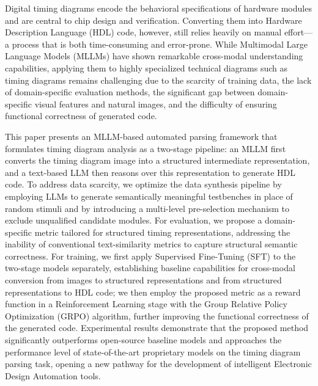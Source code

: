 \begin{abstract*}
  Digital timing diagrams encode the behavioral specifications of hardware modules and are central to chip design and verification. Converting them into Hardware Description Language (HDL) code, however, still relies heavily on manual effort---a process that is both time-consuming and error-prone. While Multimodal Large Language Models (MLLMs) have shown remarkable cross-modal understanding capabilities, applying them to highly specialized technical diagrams such as timing diagrams remains challenging due to the scarcity of training data, the lack of domain-specific evaluation methods, the significant gap between domain-specific visual features and natural images, and the difficulty of ensuring functional correctness of generated code.

  This paper presents an MLLM-based automated parsing framework that formulates timing diagram analysis as a two-stage pipeline: an MLLM first converts the timing diagram image into a structured intermediate representation, and a text-based LLM then reasons over this representation to generate HDL code.
  To address data scarcity, we optimize the data synthesis pipeline by employing LLMs to generate semantically meaningful testbenches in place of random stimuli and by introducing a multi-level pre-selection mechanism to exclude unqualified candidate modules.
  For evaluation, we propose a domain-specific metric tailored for structured timing representations, addressing the inability of conventional text-similarity metrics to capture structural semantic correctness.
  For training, we first apply Supervised Fine-Tuning (SFT) to the two-stage models separately, establishing baseline capabilities for cross-modal conversion from images to structured representations and from structured representations to HDL code; we then employ the proposed metric as a reward function in a Reinforcement Learning stage with the Group Relative Policy Optimization (GRPO) algorithm, further improving the functional correctness of the generated code.
  Experimental results demonstrate that the proposed method significantly outperforms open-source baseline models and approaches the performance level of state-of-the-art proprietary models on the timing diagram parsing task, opening a new pathway for the development of intelligent Electronic Design Automation tools.

\end{abstract*}
